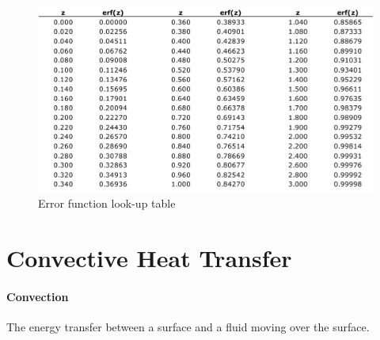 \documentclass[12pt, a4paper]{article}
\begin{document}
\begin{figure}[H]
    \centering
    \includegraphics[width=\textwidth]{img/error_function.pdf}
    \caption{Error function look-up table}
    \label{fig:my_label}
\end{figure}


\newpage
\section{Convective Heat Transfer}
\paragraph{Convection} The energy transfer between a surface and a fluid moving over the surface.
\end{document}
